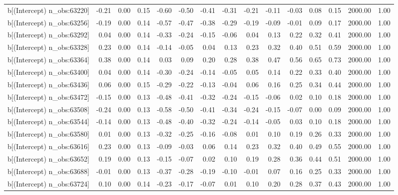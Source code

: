 \begin{table}[ht]
\begin{tabular}{rrrrrrrrrrrrrrr}
  b[(Intercept) n\_obs:63220] & -0.21 & 0.00 & 0.15 & -0.60 & -0.50 & -0.41 & -0.31 & -0.21 & -0.11 & -0.03 & 0.08 & 0.15 & 2000.00 & 1.00 \\ 
  b[(Intercept) n\_obs:63256] & -0.19 & 0.00 & 0.14 & -0.57 & -0.47 & -0.38 & -0.29 & -0.19 & -0.09 & -0.01 & 0.09 & 0.17 & 2000.00 & 1.00 \\ 
  b[(Intercept) n\_obs:63292] & 0.04 & 0.00 & 0.14 & -0.33 & -0.24 & -0.15 & -0.06 & 0.04 & 0.13 & 0.22 & 0.32 & 0.41 & 2000.00 & 1.00 \\ 
  b[(Intercept) n\_obs:63328] & 0.23 & 0.00 & 0.14 & -0.14 & -0.05 & 0.04 & 0.13 & 0.23 & 0.32 & 0.40 & 0.51 & 0.59 & 2000.00 & 1.00 \\ 
  b[(Intercept) n\_obs:63364] & 0.38 & 0.00 & 0.14 & 0.03 & 0.09 & 0.20 & 0.28 & 0.38 & 0.47 & 0.56 & 0.65 & 0.73 & 2000.00 & 1.00 \\ 
  b[(Intercept) n\_obs:63400] & 0.04 & 0.00 & 0.14 & -0.30 & -0.24 & -0.14 & -0.05 & 0.05 & 0.14 & 0.22 & 0.33 & 0.40 & 2000.00 & 1.00 \\ 
  b[(Intercept) n\_obs:63436] & 0.06 & 0.00 & 0.15 & -0.29 & -0.22 & -0.13 & -0.04 & 0.06 & 0.16 & 0.25 & 0.34 & 0.44 & 2000.00 & 1.00 \\ 
  b[(Intercept) n\_obs:63472] & -0.15 & 0.00 & 0.13 & -0.48 & -0.41 & -0.32 & -0.24 & -0.15 & -0.06 & 0.02 & 0.10 & 0.18 & 2000.00 & 1.00 \\ 
  b[(Intercept) n\_obs:63508] & -0.24 & 0.00 & 0.13 & -0.58 & -0.50 & -0.41 & -0.34 & -0.24 & -0.15 & -0.07 & 0.00 & 0.09 & 2000.00 & 1.00 \\ 
  b[(Intercept) n\_obs:63544] & -0.14 & 0.00 & 0.13 & -0.48 & -0.40 & -0.32 & -0.24 & -0.14 & -0.05 & 0.03 & 0.10 & 0.18 & 2000.00 & 1.00 \\ 
  b[(Intercept) n\_obs:63580] & 0.01 & 0.00 & 0.13 & -0.32 & -0.25 & -0.16 & -0.08 & 0.01 & 0.10 & 0.19 & 0.26 & 0.33 & 2000.00 & 1.00 \\ 
  b[(Intercept) n\_obs:63616] & 0.23 & 0.00 & 0.13 & -0.09 & -0.03 & 0.06 & 0.14 & 0.23 & 0.32 & 0.40 & 0.49 & 0.55 & 2000.00 & 1.00 \\ 
  b[(Intercept) n\_obs:63652] & 0.19 & 0.00 & 0.13 & -0.15 & -0.07 & 0.02 & 0.10 & 0.19 & 0.28 & 0.36 & 0.44 & 0.51 & 2000.00 & 1.00 \\ 
  b[(Intercept) n\_obs:63688] & -0.01 & 0.00 & 0.13 & -0.37 & -0.28 & -0.19 & -0.10 & -0.01 & 0.07 & 0.16 & 0.25 & 0.33 & 2000.00 & 1.00 \\ 
  b[(Intercept) n\_obs:63724] & 0.10 & 0.00 & 0.14 & -0.23 & -0.17 & -0.07 & 0.01 & 0.10 & 0.20 & 0.28 & 0.37 & 0.43 & 2000.00 & 1.00 \\ 

\end{tabular}
\end{table}
